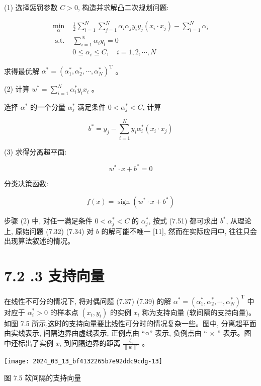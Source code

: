 \documentclass[10pt]{article}
\begin{document}
(1) 选择惩罚参数 $C>0$, 构造并求解凸二次规划问题:

$$
\begin{array}{ll}
\min _{\alpha} & \frac{1}{2} \sum_{i=1}^{N} \sum_{j=1}^{N} \alpha_{i} \alpha_{j} y_{i} y_{j}\left(x_{i} \cdot x_{j}\right)-\sum_{i=1}^{N} \alpha_{i} \\
\text { s.t. } & \sum_{i=1}^{N} \alpha_{i} y_{i}=0 \\
& 0 \leqslant \alpha_{i} \leqslant C, \quad i=1,2, \cdots, N
\end{array}
$$

求得最优解 $\alpha^{*}=\left(\alpha_{1}^{*}, \alpha_{2}^{*}, \cdots, \alpha_{N}^{*}\right)^{\mathrm{T}}$ 。

(2) 计算 $w^{*}=\sum_{i=1}^{N} \alpha_{i}^{*} y_{i} x_{i}$ 。

选择 $\alpha^{*}$ 的一个分量 $\alpha_{j}^{*}$ 满足条件 $0<\alpha_{j}^{*}<C$, 计算

$$
b^{*}=y_{j}-\sum_{i=1}^{N} y_{i} \alpha_{i}^{*}\left(x_{i} \cdot x_{j}\right)
$$

(3) 求得分离超平面:

$$
w^{*} \cdot x+b^{*}=0
$$

分类决策函数:

$$
f(x)=\operatorname{sign}\left(w^{*} \cdot x+b^{*}\right)
$$

步骤 (2) 中, 对任一满足条件 $0<\alpha_{j}^{*}<C$ 的 $\alpha_{j}^{*}$, 按式 (7.51) 都可求出 $b^{*}$, 从理论上, 原始问题 (7.32) (7.34) 对 $b$ 的解可能不唯一 [11], 然而在实际应用中, 往往只会出现算法叙述的情况。

\section*{7.2 .3 支持向量}
在线性不可分的情况下, 将对偶问题 (7.37) (7.39) 的解 $\alpha^{*}=\left(\alpha_{1}^{*}, \alpha_{2}^{*}, \cdots, \alpha_{N}^{*}\right)^{\mathrm{T}}$ 中对应于 $\alpha_{i}^{*}>0$ 的样本点 $\left(x_{i}, y_{i}\right)$ 的实例 $x_{i}$ 称为支持向量 (软间隔的支持向量)。如图 7.5 所示,这时的支持向量要比线性可分时的情况复杂一些。图中, 分离超平面由实线表示, 间隔边界由虚线表示, 正例点由 “○” 表示, 负例点由 “ $\times$ ” 表示。图中还标出了实例 $x_{i}$ 到间隔边界的距离 $\frac{\xi_{i}}{\|w\|^{\circ}}$ 。

\begin{center}
\texttt{[image: 2024\_03\_13\_bf4132265b7e92ddc9cdg-13]}
\end{center}

图 7.5 软间隔的支持向量
\end{document}

